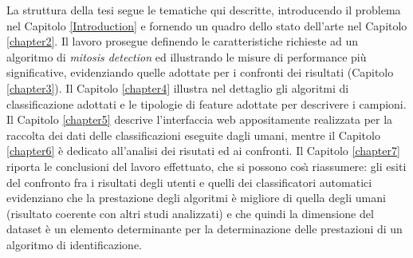 La struttura della tesi segue le tematiche qui descritte, introducendo il problema nel Capitolo \ref{Introduction} e fornendo un quadro dello stato dell'arte nel Capitolo \ref{chapter2}.
Il lavoro prosegue definendo le caratteristiche richieste ad un algoritmo di \textit{mitosis detection} ed illustrando le misure di performance pi\`{u} significative, evidenziando
quelle adottate per i confronti dei risultati (Capitolo \ref{chapter3}). Il Capitolo \ref{chapter4} illustra nel dettaglio gli algoritmi di classificazione adottati e le tipologie
di feature adottate per descrivere i campioni. Il Capitolo \ref{chapter5} descrive l'interfaccia web appositamente realizzata per la raccolta dei dati delle classificazioni 
eseguite dagli umani, mentre il Capitolo \ref{chapter6} \`{e} dedicato all'analisi dei risutati ed ai confronti. Il Capitolo \ref{chapter7} riporta le conclusioni del lavoro
effettuato, che si possono cos\`{\i} riassumere: gli esiti del confronto fra i risultati degli utenti e quelli dei classificatori automatici evidenziano che la prestazione degli
algoritmi \`{e} migliore di quella degli umani (risultato coerente con altri studi analizzati) e che quindi la dimensione del dataset
\`{e} un elemento determinante per la determinazione delle prestazioni di un algoritmo di identificazione.
